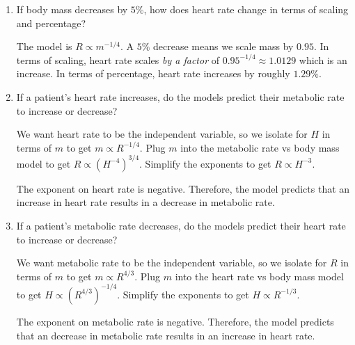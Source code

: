 \documentclass[../main.tex]{subfiles}
\begin{document}
\begin{exercise}
\begin{enumerate}
\begin{solution}
      \end{solution}

    \item If body mass decreases by \(5\%\), how does heart rate change in terms of scaling and percentage?
      \begin{solution}
        The model is \(R \propto m^{-1/4}\). A \(5\%\) decrease means we scale mass by \(0.95\). In terms of scaling, heart rate scales \emph{by a factor} of \(0.95^{-1/4} \approx 1.0129\) which is an increase. In terms of percentage, heart rate increases by roughly \(1.29\%\).

      \end{solution}

    \item If a patient's heart rate increases, do the models predict their metabolic rate to increase or decrease?
      \begin{solution}
        We want heart rate to be the independent variable, so we isolate for \(H\) in terms of \(m\) to get \(m \propto R^{-1/4}\). Plug \(m\) into the metabolic rate vs body mass model to get \(R \propto (H^{-4})^{3/4}\). Simplify the exponents to get \(R \propto H^{-3}\).

        The exponent on heart rate is negative. Therefore, the model predicts that an increase in heart rate results in a decrease in metabolic rate.


      \end{solution}

    \item If a patient's metabolic rate decreases, do the models predict their heart rate to increase or decrease?

      \begin{solution}
        We want metabolic rate to be the independent variable, so we isolate for \(R\) in terms of \(m\) to get \(m \propto R^{4/3}\). Plug \(m\) into the heart rate vs body mass model to get \(H \propto (R^{4/3})^{-1/4}\). Simplify the exponents to get \(H \propto R^{-1/3}\).

        The exponent on metabolic rate is negative. Therefore, the model predicts that an decrease in metabolic rate results in an increase in heart rate.

      \end{solution}
  \end{enumerate}
\end{exercise}
\end{document}
